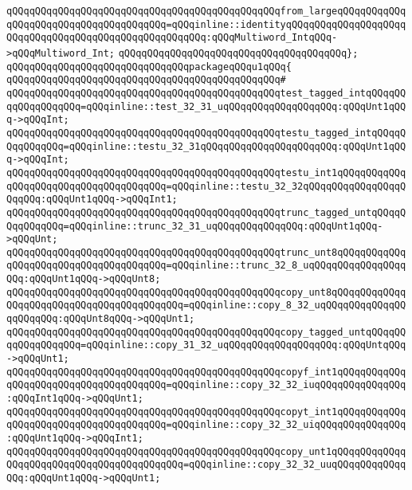\verb|qQQqqQQqqQQqqQQqqQQqqQQqqQQqqQQqqQQqqQQqqQQqqQQqfrom_largeqQQqqQQqqQQqqQQqqQQqqQQqqQQqqQQqqQQqqQQq=qQQqinline::identityqQQqqQQqqQQqqQQqqQQqqQQqqQQqqQQqqQQqqQQqqQQqqQQqqQQqqQQq:qQQqMultiword_IntqQQq->qQQqMultiword_Int;|\newline
\verb|qQQqqQQqqQQqqQQqqQQqqQQqqQQqqQQqqQQqqQQq};|\newline
\newline
\verb|qQQqqQQqqQQqqQQqqQQqqQQqqQQqqQQqpackageqQQqu1qQQq{|\newline
\verb|qQQqqQQqqQQqqQQqqQQqqQQqqQQqqQQqqQQqqQQqqQQqqQQq#|\newline
\verb|qQQqqQQqqQQqqQQqqQQqqQQqqQQqqQQqqQQqqQQqqQQqqQQqtest_tagged_intqQQqqQQqqQQqqQQqqQQq=qQQqinline::test_32_31_uqQQqqQQqqQQqqQQqqQQq:qQQqUnt1qQQq->qQQqInt;|\newline
\verb|qQQqqQQqqQQqqQQqqQQqqQQqqQQqqQQqqQQqqQQqqQQqqQQqtestu_tagged_intqQQqqQQqqQQqqQQq=qQQqinline::testu_32_31qQQqqQQqqQQqqQQqqQQqqQQq:qQQqUnt1qQQq->qQQqInt;|\newline
\verb|qQQqqQQqqQQqqQQqqQQqqQQqqQQqqQQqqQQqqQQqqQQqqQQqtestu_int1qQQqqQQqqQQqqQQqqQQqqQQqqQQqqQQqqQQqqQQq=qQQqinline::testu_32_32qQQqqQQqqQQqqQQqqQQqqQQq:qQQqUnt1qQQq->qQQqInt1;|\newline
\verb|qQQqqQQqqQQqqQQqqQQqqQQqqQQqqQQqqQQqqQQqqQQqqQQqtrunc_tagged_untqQQqqQQqqQQqqQQq=qQQqinline::trunc_32_31_uqQQqqQQqqQQqqQQq:qQQqUnt1qQQq->qQQqUnt;|\newline
\verb|qQQqqQQqqQQqqQQqqQQqqQQqqQQqqQQqqQQqqQQqqQQqqQQqtrunc_unt8qQQqqQQqqQQqqQQqqQQqqQQqqQQqqQQqqQQqqQQq=qQQqinline::trunc_32_8_uqQQqqQQqqQQqqQQqqQQq:qQQqUnt1qQQq->qQQqUnt8;|\newline
\verb|qQQqqQQqqQQqqQQqqQQqqQQqqQQqqQQqqQQqqQQqqQQqqQQqcopy_unt8qQQqqQQqqQQqqQQqqQQqqQQqqQQqqQQqqQQqqQQqqQQq=qQQqinline::copy_8_32_uqQQqqQQqqQQqqQQqqQQqqQQq:qQQqUnt8qQQq->qQQqUnt1;|\newline
\verb|qQQqqQQqqQQqqQQqqQQqqQQqqQQqqQQqqQQqqQQqqQQqqQQqcopy_tagged_untqQQqqQQqqQQqqQQqqQQq=qQQqinline::copy_31_32_uqQQqqQQqqQQqqQQqqQQq:qQQqUntqQQq->qQQqUnt1;|\newline
\verb|qQQqqQQqqQQqqQQqqQQqqQQqqQQqqQQqqQQqqQQqqQQqqQQqcopyf_int1qQQqqQQqqQQqqQQqqQQqqQQqqQQqqQQqqQQqqQQq=qQQqinline::copy_32_32_iuqQQqqQQqqQQqqQQq:qQQqInt1qQQq->qQQqUnt1;|\newline
\verb|qQQqqQQqqQQqqQQqqQQqqQQqqQQqqQQqqQQqqQQqqQQqqQQqcopyt_int1qQQqqQQqqQQqqQQqqQQqqQQqqQQqqQQqqQQqqQQq=qQQqinline::copy_32_32_uiqQQqqQQqqQQqqQQq:qQQqUnt1qQQq->qQQqInt1;|\newline
\verb|qQQqqQQqqQQqqQQqqQQqqQQqqQQqqQQqqQQqqQQqqQQqqQQqcopy_unt1qQQqqQQqqQQqqQQqqQQqqQQqqQQqqQQqqQQqqQQqqQQq=qQQqinline::copy_32_32_uuqQQqqQQqqQQqqQQq:qQQqUnt1qQQq->qQQqUnt1;|\newline

